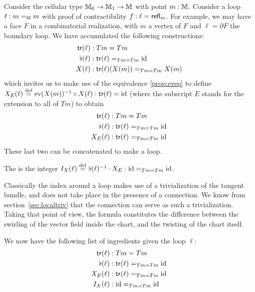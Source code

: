 Consider the cellular type \( \mathbb{M}_0\to\mathbb{M}_1\to\mathbb{M} \) with point \( m:\mathbb{M} \). Consider a loop \( \ell:m=_{\mathbb{M}} m \) with proof of contractibility \( f:\ell=\mathsf{refl}_m \). For example, we may have a face \( F \) in a combinatorial realization, with \( m \) a vertex of \( F \) and \( \ell=\partial F \) the boundary loop. We have accumulated the following constructions:
\[\begin{aligned}
\mathsf{tr}(\ell)&:Tm=Tm\\
\flat(\ell)&:\mathsf{tr}(\ell)=_{Tm=Tm}\text{id}\\
X(\ell)&:\mathsf{tr}(\ell)(X(m))=_{Tm=Tm}X(m)\\
\end{aligned}\]
which invites us to make use of the equivalence \ref{prop:eveq} to define \( X_E(\ell)\stackrel{\mathrm{def}}{=} \mathrm{ev}(X(m))^{-1}\circ X(\ell):\mathsf{tr}(\ell)=\text{id} \) (where the subscript \( E \) stands for the extension to all of \( Tm \)) to obtain
\[
\begin{aligned}
\mathsf{tr}(\ell)&:Tm=Tm\\
\flat(\ell)&:\mathsf{tr}(\ell)=_{Tm=Tm}\text{id}\\
X_E(\ell)&:\mathsf{tr}(\ell)=_{Tm=Tm}\text{id}\\
\end{aligned}
\]
These last two can be concatenated to make a loop.
\begin{mydef}
The  is the integer \( I_X(\ell)\stackrel{\mathrm{def}}{=}\flat(\ell)^{-1}\cdot X_E:\text{id}=_{Tm=Tm}\text{id} \).
\end{mydef}
\begin{mynote}
Classically the index around a loop makes use of a trivialization of the tangent bundle, and does not take place in the presence of a connection. We know from section~\ref{sec:localtriv} that the connection can serve as such a trivialization. Taking that point of view, the formula constitutes the difference between the swirling of the vector field inside the chart, and the twisting of the chart itself. 
\end{mynote}
We now have the following list of ingredients given the loop \( \ell \):
\begin{equation}
\label{eq:face_elements}
\begin{aligned}
\mathsf{tr}(\ell)&:Tm=Tm\\
\flat(\ell)&:\mathsf{tr}(\ell)=_{Tm=Tm}\text{id}\\
X_E(\ell)&:\mathsf{tr}(\ell)=_{Tm=Tm}\text{id}\\
I_X(\ell)&:\text{id}=_{Tm=Tm}\text{id}\\
\end{aligned}
\end{equation}

